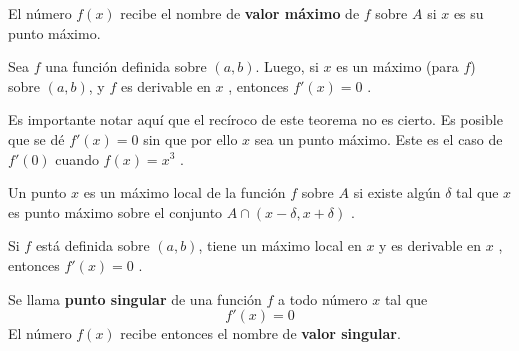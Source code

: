\documentclass[14pt,a4paper]{extarticle}
\begin{document}
\begin{mydef}
El n\'umero \( f(x) \) recibe el nombre de \textbf{valor m\'aximo} de
\( f \) sobre \( A \) si \( x \) es su punto m\'aximo.
\end{mydef}

\begin{theorem}
Sea \( f \) una funci\'on definida sobre \( (a,b) \). Luego, si \( x \)
es un m\'aximo (para \( f \)) sobre \( (a,b) \), y \( f \) es
derivable en \( x \) , entonces \( f'(x)=0 \) .
\end{theorem}
Es importante notar aqu\'i que el rec\'iroco de este teorema no es
cierto. Es posible que se d\'e \( f'(x)=0 \) sin que por ello \( x \)
sea un punto m\'aximo. Este es el caso de \( f'(0) \) cuando \(
f(x)=x^3 \) .

\begin{mydef}
Un punto \( x \) es un m\'aximo local de la funci\'on \( f \) sobre \(
A \) si existe alg\'un \( \delta \) tal que \( x \) es punto m\'aximo
sobre el conjunto \( A \cap (x-\delta, x+\delta) \) .
\end{mydef}

\begin{theorem}
Si \( f \) est\'a definida sobre \( (a,b) \), tiene un m\'aximo local
en \( x \) y es derivable en \( x \) , entonces \( f'(x)=0 \) .
\end{theorem}

\begin{mydef}
Se llama \textbf{punto singular} de una funci\'on \( f \)  a todo
n\'umero \( x \) tal que
\[ f'(x)=0 \]
El n\'umero \( f(x) \) recibe entonces el nombre de \textbf{valor singular}.
\end{mydef}
\end{document}
